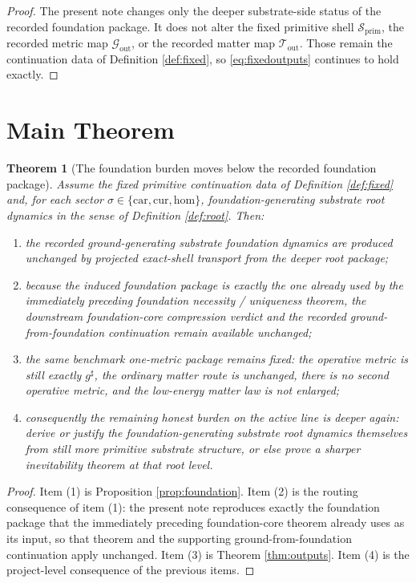 \documentclass[11pt]{article}
\newcommand{\CompletedMetric}{g^{\sharp}}
\newcommand{\Car}{\mathrm{car}}
\newcommand{\Cur}{\mathrm{cur}}
\newcommand{\Hom}{\mathrm{hom}}
\newcommand{\PrimShell}{\mathcal S_{\mathrm{prim}}}
\newcommand{\MetricOut}{\mathscr G_{\mathrm{out}}}
\newcommand{\MatterOut}{\mathscr T_{\mathrm{out}}}
\newtheorem{theorem}{Theorem}
\begin{document}
\begin{proof}
The present note changes only the deeper substrate-side status of the recorded foundation package. It does not alter the fixed primitive shell \(\PrimShell\), the recorded metric map \(\MetricOut\), or the recorded matter map \(\MatterOut\). Those remain the continuation data of Definition \ref{def:fixed}, so \eqref{eq:fixedoutputs} continues to hold exactly.
\end{proof}

\section{Main Theorem}

\begin{theorem}[The foundation burden moves below the recorded foundation package]
\label{thm:main}
Assume the fixed primitive continuation data of Definition \ref{def:fixed} and, for each sector \(\sigma\in\{\Car,\Cur,\Hom\}\), foundation-generating substrate root dynamics in the sense of Definition \ref{def:root}. Then:
\begin{enumerate}
    \item the recorded ground-generating substrate foundation dynamics are produced unchanged by projected exact-shell transport from the deeper root package;
    \item because the induced foundation package is exactly the one already used by the immediately preceding foundation necessity / uniqueness theorem, the downstream foundation-core compression verdict and the recorded ground-from-foundation continuation remain available unchanged;
    \item the same benchmark one-metric package remains fixed: the operative metric is still exactly \(\CompletedMetric\), the ordinary matter route is unchanged, there is no second operative metric, and the low-energy matter law is not enlarged;
    \item consequently the remaining honest burden on the active line is deeper again: derive or justify the foundation-generating substrate root dynamics themselves from still more primitive substrate structure, or else prove a sharper inevitability theorem at that root level.
\end{enumerate}
\end{theorem}

\begin{proof}
Item (1) is Proposition \ref{prop:foundation}. Item (2) is the routing consequence of item (1): the present note reproduces exactly the foundation package that the immediately preceding foundation-core theorem already uses as its input, so that theorem and the supporting ground-from-foundation continuation apply unchanged. Item (3) is Theorem \ref{thm:outputs}. Item (4) is the project-level consequence of the previous items.
\end{proof}
\end{document}
